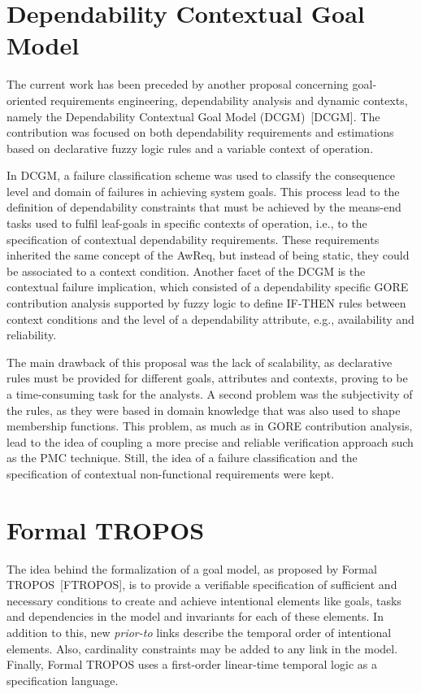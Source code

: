 \section{Dependability Contextual Goal Model}

The current work has been preceded by another proposal concerning goal-oriented requirements engineering, dependability analysis and dynamic contexts, namely the Dependability Contextual Goal Model (DCGM)~[DCGM]. The contribution was focused on both dependability requirements and estimations based on declarative fuzzy logic rules and a variable context of operation.

In DCGM, a failure classification scheme was used to classify the consequence level and domain of failures in achieving system goals. This process lead to the definition of dependability constraints that must be achieved by the means-end tasks used to fulfil leaf-goals in specific contexts of operation, i.e., to the specification of contextual dependability requirements. These requirements inherited the same concept of the AwReq, but instead of being static, they could be associated to a context condition. Another facet of the DCGM is the contextual failure implication, which consisted of a dependability specific GORE contribution analysis supported by fuzzy logic to define IF-THEN rules between context conditions and the level of a dependability attribute, e.g., availability and reliability.

The main drawback of this proposal was the lack of scalability, as declarative rules must be provided for different goals, attributes and contexts, proving to be a time-consuming task for the analysts. A second problem was the subjectivity of the rules, as they were based in domain knowledge that was also used to shape membership functions. This problem, as much as in GORE contribution analysis, lead to the idea of coupling a more precise and reliable verification approach such as the PMC technique. Still, the idea of a failure classification and the specification of contextual non-functional requirements were kept.

\section{Formal TROPOS}

The idea behind the formalization of a goal model, as proposed by Formal TROPOS~[FTROPOS], is to provide a verifiable specification of sufficient and necessary conditions to create and achieve intentional elements like goals, tasks and dependencies in the model and invariants for each of these elements. In addition to this, new \textit{prior-to} links describe the temporal order of intentional elements. Also, cardinality constraints may be added to any link in the model. Finally, Formal TROPOS uses a first-order linear-time temporal logic as a specification language.

